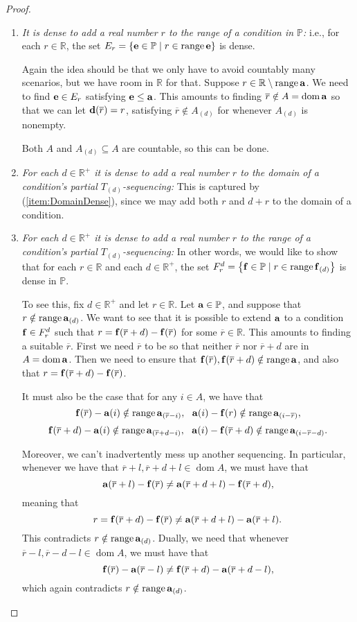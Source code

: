 \documentclass{amsart}
\theoremstyle{definition}
\theoremstyle{remark}
\renewcommand{\P}{\mathbb{P}}
\newcommand{\R}{\mathbb{R}}
\DeclareMathOperator{\ran}{range}
\DeclareMathOperator{\dom}{dom}
\newcommand{\st}{\; | \;}
\newcommand{\set}[2]{\left\{#1\st #2 \right\}}
\renewcommand{\a}{\textup{\textbf{a}}}
\renewcommand{\d}{\textup{\textbf{d}}}
\newcommand{\e}{\textup{\textbf{e}}}
\newcommand{\f}{\textup{\textbf{f}}}
\renewcommand{\r}{\overline r}
\begin{document}
\begin{proof}
\begin{enumerate}
	\item \emph{It is dense to add a real number $r$ to the range of a condition in $\P$:} i.e., for each $r \in \R$, the set $E_r=\set{\e \in \P}{r \in \ran \e }$ is dense. 
	
	Again the idea should be that we only have to avoid countably many scenarios, but we have room in $\R$ for that. Suppose $r \in \R \setminus \ran \a$. We need to find $\e \in E_r$ satisfying $\e \leq \a$. This amounts to finding $\r \notin A = \dom \a$ so that we can let $\d(\overline r)=r$, satisfying $\r \notin A_{(d)}$ for whenever $A_{(d)}$ is nonempty.
	
	Both $A$ and $A_{(d)} \subseteq A$ are countable, so this can be done. \\
		
	\item \label{item:StepFunctionDomainDense} \emph{For each $d \in \R^+$ it is dense to add a real number $r$ to the domain of a condition's partial $T_{(d)}$-sequencing:} This is captured by (\ref{item:DomainDense}), since we may add both $r$ and $d+r$ to the domain of a condition.\\
	\item \emph{For each $d \in \R^+$ it is dense to add a real number $r$ to the range of a condition's partial $T_{(d)}$-sequencing:} In other words, we would like to show that for each $r \in \R$ and each $d \in \R^+$, the set $F^d_r=\set{\f \in \P}{r \in \ran \f_{(d)}}$ is dense in $\P$. 
	
	To see this, fix $d \in \R^+$ and let $r \in \R$. Let $\a \in \P$, and suppose that $r \notin \ran\a_{(d)}$. We want to see that it is possible to extend $\a$ to a condition $\f \in F^d_r$ such that $r=\f(\r+d)-\f(\r)$ for some $\r \in \R$. This amounts to finding a suitable $\r$. First we need $\r$ to be so that neither $\r$ nor $\r+d$ are in $A = \dom \a$. Then we need to ensure that $\f(\r), \f(\r+d) \notin \ran \a$, and also that $r=\f(\r+d)-\f(\r)$. 

	It must also be the case that for any $i\in A$, we have that 
		$$\f(\r)-\a(i) \notin \ran \a_{(\r-i)}, \ \  \a(i)-\f(r) \notin \ran \a_{(i-\r)},$$ 
		$$\f(\r+d) - \a(i) \notin \ran \a_{(\r+d-i)}, \ \ \a(i) - \f(\r+d) \notin \ran \a_{(i-\r-d)}.$$

Moreover, we can't inadvertently mess up another sequencing. In particular, whenever we have that $\r+l, \r+d+l \in \dom A$, we must have that $$\a(\r+l)-\f(\r)\neq \a(\r+d+l) - \f(\r+d),$$ meaning that $$r= \f(\r+d)-\f(\r) \neq \a(\r+d+l) - \a(\r+l).$$ This contradicts $r \notin \ran \a_{(d)}$. Dually, we need that whenever $\r-l, \r-d-l \in \dom A$, we must have that $$\f(\r)-\a(\r-l) \neq \f(\r+d)-\a(\r+d-l),$$ which again contradicts $r \notin \ran \a_{(d)}$.


\end{enumerate}
\end{proof}
\end{document}
